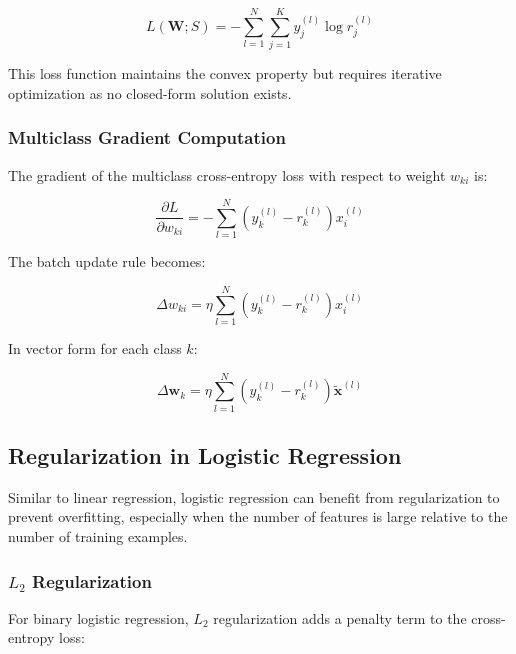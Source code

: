 \documentclass[twoside]{article}
\numberwithin{equation}{section}
\begin{document}
	\begin{equation}
	\label{eq:MulticlassCrossEntropyLoss}
		\boxed{L(\mathbf{W}; S) = -\sum_{l=1}^{N} \sum_{j=1}^{K} y_j^{(l)} \log r_j^{(l)}}
	\end{equation}

	This loss function maintains the convex property but requires iterative optimization as no closed-form solution exists.

	\subsubsection{Multiclass Gradient Computation}
	\label{subsubsec:MulticlassGradientComputation}
	The gradient of the multiclass cross-entropy loss with respect to weight $w_{ki}$ is:

	\begin{equation}
	\label{eq:MulticlassGradient}
		\boxed{\frac{\partial L}{\partial w_{ki}} = -\sum_{l=1}^{N} (y_k^{(l)} - r_k^{(l)}) x_i^{(l)}}
	\end{equation}

	The batch update rule becomes:

	\begin{equation}
	\label{eq:MulticlassWeightUpdate}
		\boxed{\Delta w_{ki} = \eta \sum_{l=1}^{N} (y_k^{(l)} - r_k^{(l)}) x_i^{(l)}}
	\end{equation}

	In vector form for each class $k$:

	\begin{equation}
	\label{eq:MulticlassVectorUpdate}
		\boxed{\Delta \mathbf{w}_k = \eta \sum_{l=1}^{N} (y_k^{(l)} - r_k^{(l)}) \tilde{\mathbf{x}}^{(l)}}
	\end{equation}

	\subsection{Regularization in Logistic Regression}
	\label{subsec:RegularizationInLogisticRegression}

	Similar to linear regression, logistic regression can benefit from regularization to prevent overfitting, especially when the number of features is large relative to the number of training examples.

	\subsubsection{$L_2$ Regularization}
	\label{subsubsec:L2RegularizationLogistic}
	For binary logistic regression, $L_2$ regularization adds a penalty term to the cross-entropy loss:
\end{document}
